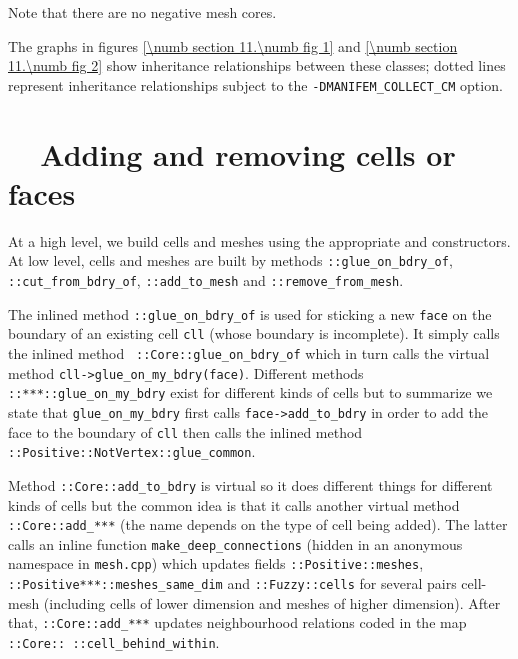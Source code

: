 Note that there are no negative mesh cores.

The graphs in figures \ref{\numb section 11.\numb fig 1} and \ref{\numb section 11.\numb fig 2}
show inheritance relationships between these classes; dotted lines represent
inheritance relationships  subject to the {\small\tt -DMANIFEM\_COLLECT\_CM} option.


\section{~~Adding and removing cells or faces}\label{\numb section 11.\numb parag 9}

At a high level, we build cells and meshes using the appropriate {\small\tt {}} and
{\small\tt {}} constructors.
At low level, cells and meshes are built by methods {\small\tt {}::glue\_on\_bdry\_of},
{\small\tt {}::cut\_from\_bdry\_of}, {\small\tt {}::add\_to\_mesh} and
{\small\tt {}::remove\_from\_mesh}.

The inlined method {\small\tt {}::glue\_on\_bdry\_of} is used for sticking a new
{\small\tt face} on the
boundary of an existing cell {\small\tt cll} (whose boundary is incomplete).
It simply calls the inlined method \ {\small\tt {}::Core::glue\_on\_bdry\_of}
which in turn calls the virtual method {\small\tt cll->glue\_on\_my\_bdry(face)}.
Different methods {\small\tt {}::***::glue\_on\_my\_bdry} exist for different kinds of
cells but to summarize we state that {\small\tt glue\_on\_my\_bdry} first calls
{\small\tt face->add\_to\_bdry} in order to add the face to the boundary of {\small\tt cll}
then calls the inlined method {\small\tt {}::Positive::NotVertex::glue\_common}.

Method {\small\tt {}::Core::add\_to\_bdry} is virtual so it does different things for
different kinds of cells but the common idea is that it calls another virtual method
{\small\tt {}::Core::add\_***} (the name depends on the type of cell being added).
The latter calls an inline function {\small\tt make\_deep\_connections} (hidden in an anonymous
namespace in {\small\tt mesh.cpp}) which updates fields
{\small\tt {}::Positive::meshes}, {\small\tt {}::Positive***::meshes\_same\_dim} and
{\small\tt {}::Fuzzy::cells} for several pairs cell-mesh
(including cells of lower dimension and meshes of higher dimension).
After that, {\small\tt {}::Core::add\_***} updates neighbourhood relations
coded in the map {\small\tt {}::Core:: ::cell\_behind\_within}.

